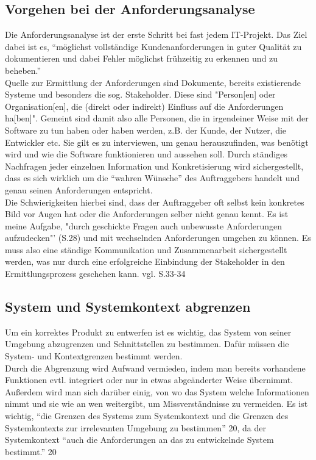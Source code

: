 \documentclass [12pt, a4paper, oneside, titlepage, ngerman]{article}
\begin{document}
\subsection{Vorgehen bei der Anforderungsanalyse}
Die Anforderungsanalyse ist der erste Schritt bei fast jedem IT-Projekt. Das Ziel dabei ist es, "`möglichst vollständige Kundenanforderungen in guter Qualität zu dokumentieren und dabei Fehler möglichst frühzeitig zu erkennen und zu beheben."' \cite[11]{pohlrupp2015} \\
Quelle zur Ermittlung der Anforderungen sind Dokumente, bereits existierende Systeme und besonders die sog. Stakeholder. Diese sind {\color {blue}"Person[en] oder Organisation[en], die (direkt oder indirekt) Einfluss auf die Anforderungen ha[ben]".} Gemeint sind damit also alle Personen, die in irgendeiner Weise mit der Software zu tun haben oder haben werden, z.B. der Kunde, der Nutzer, die Entwickler etc. Sie gilt es zu interviewen, um genau herauszufinden, was benötigt wird und wie die Software funktionieren und aussehen soll. Durch ständiges Nachfragen jeder einzelnen Information und Konkretisierung wird sichergestellt, dass es sich wirklich um die "`wahren Wünsche"'  des Auftraggebers handelt und genau seinen Anforderungen entspricht.  \\
Die Schwierigkeiten hierbei sind, dass der Auftraggeber oft selbst kein konkretes Bild vor Augen hat oder die Anforderungen selber nicht genau kennt. Es ist meine Aufgabe, {\color{blue} "durch geschickte Fragen auch unbewusste Anforderungen aufzudecken"' (S.28)}  und mit wechselnden Anforderungen umgehen zu können.
Es muss also eine ständige Kommunikation und Zusammenarbeit sichergestellt werden, was nur durch eine erfolgreiche Einbindung der Stakeholder in den Ermittlungsprozess geschehen kann. {\color{blue} vgl. S.33-34}

\subsection{System und Systemkontext abgrenzen}
Um ein korrektes Produkt zu entwerfen ist es wichtig, das System von seiner Umgebung abzugrenzen und Schnittstellen zu bestimmen. Dafür müssen die System- und Kontextgrenzen bestimmt werden. \\
Durch die Abgrenzung wird Aufwand vermieden, indem man bereits vorhandene Funktionen evtl. integriert oder nur in etwas abgeänderter Weise übernimmt. Außerdem wird man sich darüber einig, von wo das System welche Informationen nimmt und sie wie an wen weitergibt, um Missverständnisse zu vermeiden. Es ist wichtig, {\color{blue} "`die Grenzen des Systems zum Systemkontext und die Grenzen des Systemkontexts zur irrelevanten Umgebung zu bestimmen"' 20}, da der Systemkontext {\color{blue} "`auch die Anforderungen an das zu entwickelnde System bestimmt."' 20}
\newpage
\end{document}

